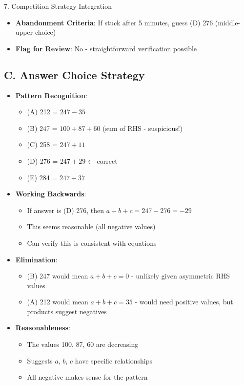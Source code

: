 \documentclass[12pt]{article}
\begin{document}
\begin{competitionbox}{7. Competition Strategy Integration}
\begin{itemize}[leftmargin=*]
    \item \textbf{Abandonment Criteria}: If stuck after 5 minutes, guess (D) 276 (middle-upper choice)
    
    \item \textbf{Flag for Review}: No - straightforward verification possible
\end{itemize}

\subsection*{C. Answer Choice Strategy}
\begin{itemize}[leftmargin=*]
    \item \textbf{Pattern Recognition}:
    \begin{itemize}
        \item (A) 212 = $247 - 35$
        \item (B) 247 = $100 + 87 + 60$ (sum of RHS - suspicious!)
        \item (C) 258 = $247 + 11$
        \item (D) 276 = $247 + 29$ ← correct
        \item (E) 284 = $247 + 37$
    \end{itemize}
    
    \item \textbf{Working Backwards}:
    \begin{itemize}
        \item If answer is (D) 276, then $a+b+c = 247 - 276 = -29$
        \item This seems reasonable (all negative values)
        \item Can verify this is consistent with equations
    \end{itemize}
    
    \item \textbf{Elimination}:
    \begin{itemize}
        \item (B) 247 would mean $a+b+c = 0$ - unlikely given asymmetric RHS values
        \item (A) 212 would mean $a+b+c = 35$ - would need positive values, but products suggest negatives
    \end{itemize}
    
    \item \textbf{Reasonableness}:
    \begin{itemize}
        \item The values 100, 87, 60 are decreasing
        \item Suggests $a$, $b$, $c$ have specific relationships
        \item All negative makes sense for the pattern
    \end{itemize}
\end{itemize}


\end{competitionbox}
\end{document}
